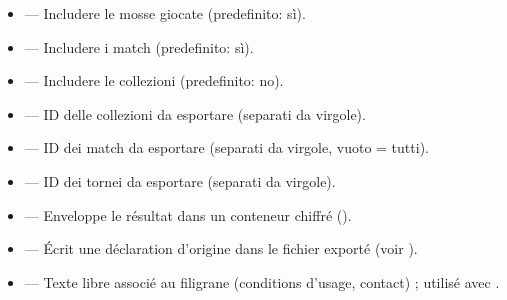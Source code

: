 \documentclass[letterpaper,10pt,italian]{sphinxmanual}
\begin{document}
\begin{itemize}
\item {} 
\sphinxAtStartPar
{} — Includere le mosse giocate (predefinito: sì).

\item {} 
\sphinxAtStartPar
{} — Includere i match (predefinito: sì).

\item {} 
\sphinxAtStartPar
{} — Includere le collezioni (predefinito: no).

\item {} 
\sphinxAtStartPar
{} — ID delle collezioni da esportare (separati da virgole).

\item {} 
\sphinxAtStartPar
{} — ID dei match da esportare (separati da virgole, vuoto = tutti).

\item {} 
\sphinxAtStartPar
{} — ID dei tornei da esportare (separati da virgole).

\item {} 
\sphinxAtStartPar
{} — Enveloppe le résultat dans un conteneur chiffré ().

\item {} 
\sphinxAtStartPar
{} — Écrit une déclaration d’origine  dans le fichier
exporté (voir {\hyperref[\detokenize{manuel:diffusion-controlee}]{}}).

\item {} 
\sphinxAtStartPar
{} — Texte libre associé au filigrane (conditions
d’usage, contact) ; utilisé avec .

\end{itemize}

\sphinxAtStartPar
{}
\end{document}
